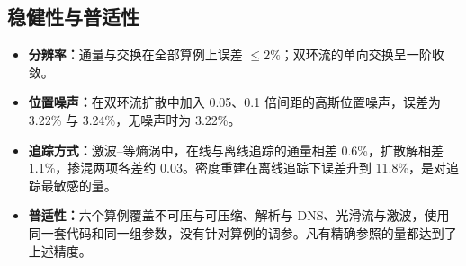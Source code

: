 \documentclass[10.5pt,a4paper]{article}
\begin{document}
\subsection{稳健性与普适性}
\begin{itemize}
\item \textbf{分辨率：}通量与交换在全部算例上误差 $\le2\%$；双环流的单向交换呈一阶收敛。
\item \textbf{位置噪声：}在双环流扩散中加入 0.05、0.1 倍间距的高斯位置噪声，误差为 3.22\% 与 3.24\%，无噪声时为 3.22\%。
\item \textbf{追踪方式：}激波–等熵涡中，在线与离线追踪的通量相差 0.6\%，扩散解相差 1.1\%，掺混两项各差约 0.03。密度重建在离线追踪下误差升到 11.8\%，是对追踪最敏感的量。
\item \textbf{普适性：}六个算例覆盖不可压与可压缩、解析与 DNS、光滑流与激波，使用同一套代码和同一组参数，没有针对算例的调参。凡有精确参照的量都达到了上述精度。
\end{itemize}
\end{document}
